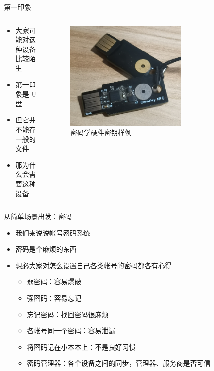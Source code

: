 \documentclass[aspectratio=169]{ctexbeamer}
\begin{document}
\begin{frame}{第一印象}
  \begin{columns}
    \begin{column}{0.5\textwidth}
      \begin{itemize}
        \item 大家可能对这种设备比较陌生
        \item 第一印象是 U 盘
        \item 但它并不能存一般的文件
        \item 那为什么会需要这种设备
      \end{itemize}
    \end{column}
    \begin{column}{0.5\textwidth}
      \begin{figure}
        \centering
        \includegraphics[width=0.7\textwidth]{img/key.jpg}
        \caption{密码学硬件密钥样例}
      \end{figure}
    \end{column}
  \end{columns}
\end{frame}

\begin{frame}{从简单场景出发：密码}
  \begin{itemize}
    \item<1-> 我们来说说帐号密码系统
    \item<1-> 密码是个麻烦的东西
    \item<2-> 想必大家对怎么设置自己各类帐号的密码都各有心得\begin{itemize}
      \item<3-> 弱密码：容易爆破
      \item<3-> 强密码：容易忘记
      \item<3-> 忘记密码：找回密码很麻烦
      \item<4-> 各帐号同一个密码：容易泄漏
      \item<5-> 将密码记在小本本上：不是良好习惯
      \item<5-> 密码管理器：各个设备之间的同步，管理器、服务商是否可信
    \end{itemize}
  \end{itemize}
\end{frame}
\end{document}
